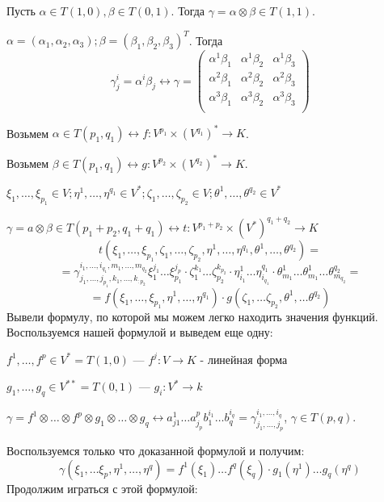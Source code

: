 Пусть $\alpha \in T(1,0), \beta \in T(0,1)$. Тогда $\gamma = \alpha \otimes \beta  \in T(1,1)$.

$\alpha = (\alpha_1,\alpha_2,\alpha_3); \beta =(\beta_1,\beta_2,\beta_3)^T$. Тогда
$$\gamma^i_j =\alpha^i\beta_j \leftrightarrow \gamma = \begin{pmatrix}
    \alpha^1\beta_1 &\alpha^1\beta_2 & \alpha^1 \beta_3 \\
    \alpha^2\beta_1 &\alpha^2\beta_2 & \alpha^2 \beta_3 \\
     \alpha^3\beta_1 &\alpha^3\beta_2 & \alpha^3 \beta_3 \\
\end{pmatrix}$$



Возьмем $\alpha \in T(p_1,q_1) \leftrightarrow f: V^{p_1}\times(V^{q_1})^* \rightarrow K$. 

Возьмем $\beta \in T(p_1,q_1) \leftrightarrow g: V^{p_2}\times(V^{q_2})^* \rightarrow K$.

$\xi_1,\ldots, \xi_{p_1} \in V;\eta^1,\ldots, \eta^{q_1}\in V^*;\zeta_1,\ldots, \zeta_{p_2}\in V; \theta^1,\ldots, \theta^{q_2}\in V^*$

$\gamma = a \otimes \beta \in T(p_1+p_2, q_1+q_1)\leftrightarrow t: V^{p_1+p_2}\times (V^*)^{q_1+q_2}\rightarrow K$
$$t(\xi_1,\ldots,\xi_{p_1},\zeta_1,\ldots,\zeta_{p_2}, \eta^1,\ldots, \eta^{q_1},\theta^1,\ldots, \theta^{q_2}) =$$$$= \gamma_{j_1,\ldots,j_{p_1},k_1,\ldots,k_{:p_2}}^{i_1,\ldots,i_{q_1},m_1,\ldots,m_{q_2}} \xi_1^{j_1}\ldots \xi_{p_1}^{j_p}\cdot \zeta_1^{k_1}\ldots \zeta_{p_2}^{k_{p_2}} \cdot \eta^1_{i_1}\ldots \eta_{i_{q_1}}^{q_1} \cdot \theta_{m_1}^1\ldots \theta^1_{m_1}\ldots \theta^{q_2}_{m_{q_2}} = $$
$$=f(\xi_1,\ldots, \xi_{p_1},\eta^1,\ldots, \eta^{q_1})\cdot g(\zeta_1,\ldots \zeta_{p_2}, \theta^1,\ldots \theta^{q_2}) $$
Вывели формулу, по которой мы можем легко находить значения функций. Воспользуемся нашей формулой и выведем еще одну:

$f^1,\ldots , f^p \in V^* = T(1,0)$ --- $f^j:V\rightarrow K$  - линейная форма

$g_1,\ldots,g_q\in V^{**} = T(0,1)$ --- $g_i:V^*\rightarrow k$

$\gamma = f^1\otimes \ldots \otimes f^p \otimes g_1 \otimes \ldots \otimes g_q \leftrightarrow a^1_{j1}\ldots a^{p}_{j_p}b_1^{i_1}\ldots b_q^{i_q}= \gamma^{i_1,\ldots, i_q}_{j_1,\ldots, j_p}$, $\gamma \in T(p,q)$.

Воспользуемся только что доказанной формулой и получим:
$$\gamma(\xi_1,\ldots \xi_p, \eta^1,\ldots, \eta^q)= f^1(\xi_1)\ldots f^q(\xi_q)\cdot g_1(\eta^1)\ldots g_q(\eta^q)$$
Продолжим играться с этой формулой:

